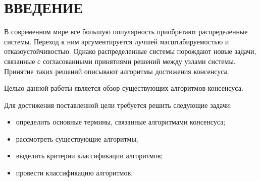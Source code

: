 \chapter*{ВВЕДЕНИЕ}

    В современном мире все большую популярность приобретают распределенные системы. Переход к ним аргументируется лучшей масштабируемостью и отказоустойчивостью. Однако распределенные системы порождают новые задачи, связанные с согласованными принятиями решений между узлами системы. Принятие таких решений описывают алгоритмы достижения консенсуса.
    
    Целью данной работы является обзор существующих алгоритмов консенсуса.
    
    Для достижения поставленной цели требуется решить следующие задачи:
    
    \begin{itemize}
        \item определить основные термины, связанные алгоритмами консенсуса;
        \item рассмотреть существующие алгоритмы;
        \item выделить критерии классификации алгоритмов;
        \item провести классификацию алгоритмов.
    \end{itemize}